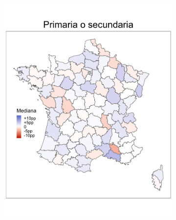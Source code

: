 \begin{figure}
\begin{subfigure}{0.275\textwidth}
	\includegraphics[width = \textwidth]{Figs/Efectos/Mapa_Efectos_Dip2_Modelo_H}
	\end{subfigure}
	~
	\begin{subfigure}{0.275\textwidth}

\end{subfigure}
\end{figure}
